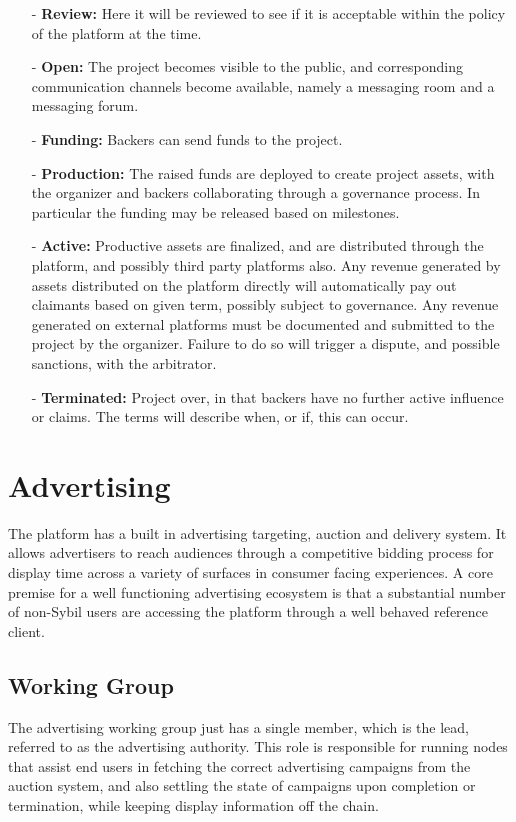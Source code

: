 \documentclass{article}
\begin{document}
\begin{itemize}
    \item[-] \textbf{Review:} Here it will be reviewed to see if it is acceptable within the policy of the platform at the time.
    \item[-] \textbf{Open:} The project becomes visible to the public, and corresponding communication channels become available, namely a messaging room and a messaging forum.
    \item[-] \textbf{Funding:} Backers can send funds to the project.
    \item[-] \textbf{Production:} The raised funds are deployed to create project assets, with the organizer and backers collaborating through a governance process. In particular the funding may be released based on milestones.
    \item[-] \textbf{Active:} Productive assets are finalized, and are distributed through the platform, and possibly third party platforms also. Any revenue generated by assets distributed on the platform directly will automatically pay out claimants based on given term, possibly subject to governance. Any revenue generated on external platforms must be documented and submitted to the project by the organizer. Failure to do so will trigger a dispute, and possible sanctions, with the arbitrator.
    \item[-] \textbf{Terminated:} Project over, in that backers have no further active influence or claims. The terms will describe when, or if, this can occur.
\end{itemize}

\section{Advertising} \label{sec:advertising}

The platform has a built in advertising targeting, auction and delivery system. It allows advertisers to reach audiences through a competitive bidding process for display time across a variety of surfaces in consumer facing experiences. A core premise for a well functioning advertising ecosystem is that a substantial number of non-Sybil users are accessing the platform through a well behaved reference client.

\subsection{Working Group}

The advertising working group just has a single member, which is the lead, referred to as the advertising authority. This role is responsible for running nodes that assist end users in fetching the correct advertising campaigns from the auction system, and also settling the state of campaigns upon completion or termination, while keeping display information off the chain.
\end{document}
